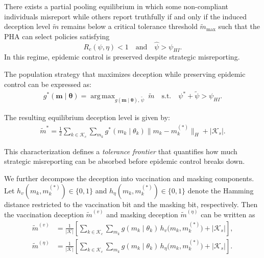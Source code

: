 \documentclass[sigconf,review]{acmart}
\DeclareMathOperator*{\argmax}{arg\,max}
\newcommand{\abs}[1]{\left| #1 \right|}
\begin{document}
\begin{theorem}
\label{thm:partial}
There exists a partial pooling equilibrium in which some non-compliant individuals misreport while others report truthfully if and only if the induced deception level $\tilde{m}$ remains below a critical tolerance threshold $\tilde{m}_{\max}$ such that the PHA can select policies satisfying
\[
R_c(\psi,\eta) < 1 \quad \text{and} \quad \widehat{\psi} > \psi_{HI}.
\]
In this regime, epidemic control is preserved despite strategic misreporting.
\end{theorem}

The population strategy that maximizes deception while preserving epidemic control can be expressed as:
\begin{equation}
\begin{aligned}
g^{\ast}(\boldsymbol{m}\mid \boldsymbol{\theta})
= \argmax_{g(\boldsymbol{m}\mid\boldsymbol{\theta}),\,\tilde{\psi}} \ \tilde{m}
\quad
\text{s.t.}\quad
\psi^{\ast} + \tilde{\psi} > \psi_{HI}.
\end{aligned}
\end{equation}

The resulting equilibrium deception level is given by:
\begin{equation}
\begin{aligned}
\tilde{m}^{\ast}
=
\frac{1}{2}\sum_{k\in \mathcal{K}_c}\sum_{m_k} g^{\ast}(m_k\mid \theta_k)\lVert m_k-m_k^{(\ast)} \rVert_H
+ |\mathcal{K}_s|.
\end{aligned}
\end{equation}

This characterization defines a \emph{tolerance frontier} that quantifies how much strategic misreporting can be absorbed before epidemic control breaks down.

We further decompose the deception into vaccination and masking components.
Let $h_v(m_k,m_k^{(*)}) \in \{0,1\}$ and $h_\eta(m_k,m_k^{(*)}) \in \{0,1\}$
denote the Hamming distance restricted to the vaccination bit and the
masking bit, respectively. Then the vaccination deception $\tilde{m}^{(v)}$
and masking deception $\tilde{m}^{(\eta)}$ can be written as
\begin{align}
\tilde{m}^{(v)}
  &= \frac{1}{|\mathcal K|}
\left[\sum_{k \in \mathcal{K}_c} \sum_{m_k} g(m_k \mid \theta_k)\,
     h_v\!\bigl(m_k, m_k^{(*)}\bigr)
     + \abs{\mathcal{K}_s}\right], \label{eq:vax-deception} \\[4pt]
\tilde{m}^{(\eta)}
  &= \frac{1}{|\mathcal K|}
\left[\sum_{k \in \mathcal{K}_c} \sum_{m_k} g(m_k \mid \theta_k)\,
     h_\eta\!\bigl(m_k, m_k^{(*)}\bigr)
     + \abs{\mathcal{K}_s}\right]. \label{eq:mask-deception}
\end{align}
\end{document}
